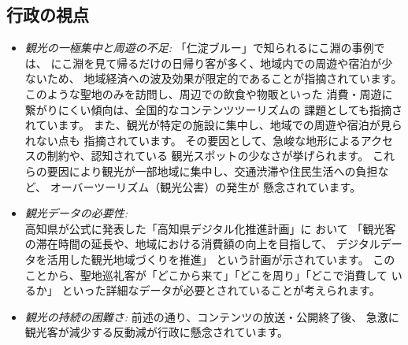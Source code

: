 \documentclass{docs}
\begin{document}
\subsection{行政の視点}
\begin{itemize}
	\item \emph{観光の一極集中と周遊の不足:}
	「仁淀ブルー」で知られるにこ淵の事例\cite{nikobuchi_mlit}では、
	にこ淵を見て帰るだけの日帰り客が多く、地域内での周遊や宿泊が少ないため、
	地域経済への波及効果が限定的であることが指摘されています。
	このような聖地のみを訪問し、周辺での飲食や物販といった
	消費・周遊に繋がりにくい傾向は、全国的なコンテンツツーリズムの
	課題としても指摘されています\cite{noda2022}。
	また、観光が特定の施設に集中し、地域での周遊や宿泊が見られない点も
	指摘されています。
	その要因として、急峻な地形によるアクセスの制約や、認知されている
	観光スポットの少なさが挙げられます。
	これらの要因により観光が一部地域に集中し、交通渋滞や住民生活への負担など、
	オーバーツーリズム（観光公害）\cite{kanko_overtourism}の発生が
	懸念されています。

	\item \emph{観光データの必要性:}
	高知県が公式に発表した「高知県デジタル化推進計画」\cite{kochi_dx_plan}に
	おいて
	「観光客の滞在時間の延長や、地域における消費額の向上を目指して、
	デジタルデータを活用した観光地域づくりを推進」
	という計画が示されています。
	このことから、聖地巡礼客が「どこから来て」「どこを周り」「どこで消費して
	いるか」
	といった詳細なデータが必要とされていることが考えられます。

	\item \emph{観光の持続の困難さ:}
	前述の通り、コンテンツの放送・公開終了後、
	急激に観光客が減少する反動減が行政に懸念されています\cite{kochi_r7_plan}。
\end{itemize}
\end{document}
